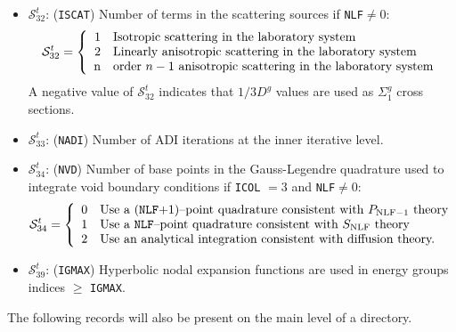 \begin{itemize}
\item $\mathcal{S}^{t}_{32}$: ({\tt ISCAT}) Number of terms in the scattering sources if {\tt NLF}$\ne 0$:
\begin{displaymath}
\mathcal{S}^{t}_{32} = \left\{
\begin{array}{rl}
 1 & \textrm{Isotropic scattering in the laboratory system} \\
 2 & \textrm{Linearly anisotropic scattering in the laboratory system} \\
 $n$ & \textrm{order $n-1$ anisotropic scattering in the laboratory system}
\end{array} \right.
\end{displaymath}
\noindent A negative value of $\mathcal{S}^{t}_{32}$ indicates that $1/3D^{g}$ values are used as $\Sigma_1^{g}$ cross sections.

\item $\mathcal{S}^{t}_{33}$: ({\tt NADI}) Number of ADI iterations at the inner
iterative level.

\item $\mathcal{S}^{t}_{34}$: ({\tt NVD}) Number of base points in the Gauss-Legendre quadrature used to integrate
void boundary conditions if {\tt ICOL} $=3$ and {\tt NLF}$\ne 0$:
\begin{displaymath}
\mathcal{S}^{t}_{34} = \left\{
\begin{array}{rl}
 0 & \textrm{Use a ({\tt NLF}$+1$)--point quadrature consistent with $P_{{\rm NLF}-1}$ theory} \\
 1 & \textrm{Use a {\tt NLF}--point quadrature consistent with $S_{\rm NLF}$ theory} \\
 2 & \textrm{Use an analytical integration consistent with diffusion theory.}
\end{array} \right.
\end{displaymath}

\item $\mathcal{S}^{t}_{39}$: ({\tt IGMAX}) Hyperbolic nodal expansion functions are used in energy groups indices $\ge$ {\tt IGMAX}.
\end{itemize}

The following records will also be present on the main level of a  directory.

\clearpage

